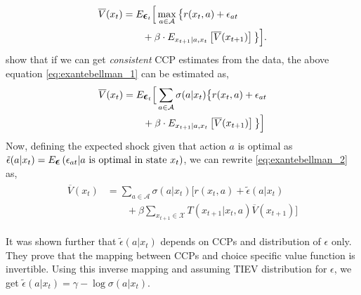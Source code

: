 \documentclass{article}
\renewcommand{\vec}[1]{\mbox{\bm{$#1$}}}
\begin{document}
\begin{align} \label{eq:exantebellman_1}
\begin{split}
\overline{V}(x_t) & = E_{\vec{\epsilon}_t}\Big[\max_{a\in\mathcal{A}} \big\{r(x_t,a)+\epsilon_{at} \\
& \qquad +\beta  \cdot E_{x_{t+1}|a,x_t} \left[ \overline{V}(x_{t+1}) \right] \big\}\Big].\\
\end{split}
\end{align}
\cite{hotz} show that if we can get \textit{consistent} CCP estimates from the data, the above equation \eqref{eq:exantebellman_1} can be estimated as,
\begin{align} \label{eq:exantebellman_2}
\begin{split}
\overline{V}(x_t) & = E_{\vec{\epsilon}_t}\Big[\sum_{a\in\mathcal{A}} \sigma(a|x_t) \big\{r(x_t,a)+\epsilon_{at} \\
& \qquad +\beta  \cdot E_{x_{t+1}|a,x_t} \left[ \overline{V}(x_{t+1}) \right] \big\}\Big]\\
\end{split}
\end{align}
Now, defining the expected shock given that action $a$ is optimal as $\tilde{\epsilon}(a|x_t) = E_{\vec{\epsilon}}\left( \epsilon_{at} |a\ \textrm{is optimal in state } x_t\right)$, we can rewrite \eqref{eq:exantebellman_2} as,
\begin{align} \label{eq:exantebellman_3}
\begin{split}
\overline{V}(x_t) & = \sum_{a\in\mathcal{A}} \sigma(a|x_t) \Big[r(x_t,a)+\tilde{\epsilon}(a|x_t) \\
& \qquad +\beta \sum_{x_{t+1}\in\mathcal{X}} T(x_{t+1}|x_t,a) \overline{V}(x_{t+1})\Big]
\end{split}
\end{align}

It was shown further that $\tilde{\epsilon}(a|x_t)$ depends on CCPs and distribution of $\epsilon$ only. They prove that the mapping between CCPs and choice specific value function is invertible. Using this inverse mapping and assuming TIEV distribution for $\epsilon$, we get $\tilde{\epsilon}(a|x_t) = \gamma - \log \sigma(a|x_t)$.
\end{document}
